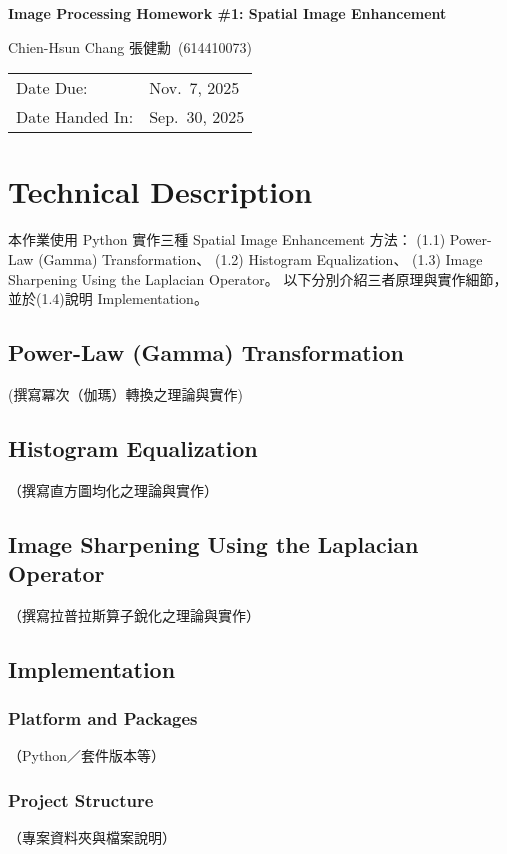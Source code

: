 \documentclass[12pt,a4paper]{article}
\newcommand{\HomeworkTitle}{Image Processing Homework \#1: Spatial Image Enhancement}
\newcommand{\StudentName}{Chien-Hsun Chang 張健勳}
\newcommand{\StudentID}{614410073}
\newcommand{\StudentInfo}{\StudentName~(\StudentID)}
\newcommand{\DateDue}{Nov.\ 7, 2025}
\newcommand{\DateHandedIn}{Sep.\ 30, 2025}
\begin{document}
\begin{titlepage}
  \centering
  {\vspace*{2cm}\Huge\bfseries \HomeworkTitle\par}
  \vspace{2cm}
  {\Large \StudentInfo\par}
  \vfill
  \begin{tabular}{@{}ll@{}}
    Date Due: & \DateDue \\
    Date Handed In: & \DateHandedIn \\
  \end{tabular}
  \vfill
\end{titlepage}

\section{Technical Description}
本作業使用 Python 實作三種 Spatial Image Enhancement 方法：
(1.1) Power-Law (Gamma) Transformation、
(1.2) Histogram Equalization、
(1.3) Image Sharpening Using the Laplacian Operator。
以下分別介紹三者原理與實作細節，並於(1.4)說明 Implementation。

\subsection{Power-Law (Gamma) Transformation}
(撰寫冪次（伽瑪）轉換之理論與實作)

\subsection{Histogram Equalization}
（撰寫直方圖均化之理論與實作）

\subsection{Image Sharpening Using the Laplacian Operator}
（撰寫拉普拉斯算子銳化之理論與實作）

\subsection{Implementation}
\subsubsection{Platform and Packages}
（Python／套件版本等）
\subsubsection{Project Structure}
（專案資料夾與檔案說明）
\end{document}
